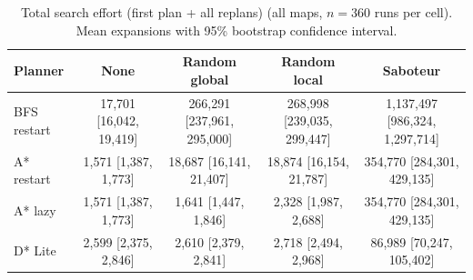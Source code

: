 \begin{table}[!t]
\centering
\footnotesize
\caption{Total search effort (first plan + all replans) (all maps, $n=360$ runs per cell). Mean expansions with 95\% bootstrap confidence interval.}
\label{tab:total}
\begin{tabular}{lcccc}
\toprule
Planner & None & Random global & Random local & Saboteur \\
\midrule
BFS restart & 17,701 [16,042, 19,419] & 266,291 [237,961, 295,000] & 268,998 [239,035, 299,447] & 1,137,497 [986,324, 1,297,714] \\
A* restart & 1,571 [1,387, 1,773] & 18,687 [16,141, 21,407] & 18,874 [16,154, 21,787] & 354,770 [284,301, 429,135] \\
A* lazy & 1,571 [1,387, 1,773] & 1,641 [1,447, 1,846] & 2,328 [1,987, 2,688] & 354,770 [284,301, 429,135] \\
D* Lite & 2,599 [2,375, 2,846] & 2,610 [2,379, 2,841] & 2,718 [2,494, 2,968] & 86,989 [70,247, 105,402] \\
\bottomrule
\end{tabular}
\end{table}

